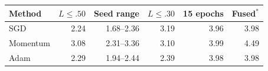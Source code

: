 \begin{tabular}{@{}lrrrrr@{}}
\toprule
Method & $L\leq.50$ & Seed range & $L\leq.30$ & 15 epochs & Fused$^{*}$ \\
\midrule
SGD & 2.24 & 1.68--2.36 & 3.19 & 3.96 & 3.98 \\
Momentum & 3.08 & 2.31--3.36 & 3.10 & 3.99 & 4.49 \\
Adam & 2.29 & 1.94--2.44 & 2.39 & 3.98 & 3.98 \\
\bottomrule
\end{tabular}

